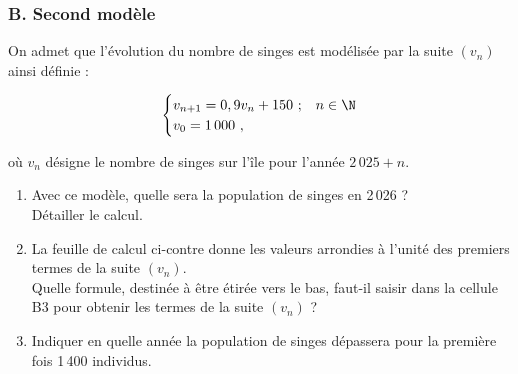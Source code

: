 \begin{minipage}[t]{0.75\textwidth}
\subsubsection*{B. Second modèle}
On admet que l'évolution du nombre de singes est modélisée par la suite $(v_n)$ ainsi définie :

\[
\begin{cases}
v_{n+1} = 0,9v_n + 150~; & n \in \N \\
v_0 = 1\,000~,
\end{cases}
\]

où $v_n$ désigne le nombre de singes sur l'île pour l'année $2\,025 + n$.

\begin{enumerate}
\item Avec ce modèle, quelle sera la population de singes en 2\,026 ? \\
Détailler le calcul.

\item La feuille de calcul ci-contre donne les valeurs arrondies à l'unité des premiers termes de la suite $(v_n)$. \\
Quelle formule, destinée à être étirée vers le bas, faut-il saisir dans la cellule B3 pour obtenir les termes de la suite $(v_n)$ ?

\item Indiquer en quelle année la population de singes dépassera pour la première fois 1\,400 individus.
\end{enumerate}
\end{minipage}
\hfill
